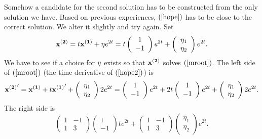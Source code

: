 \documentclass[leqno,DIV=calc,paper=a4,fontsize=11pt]{article}
\theoremstyle{definition}
\theoremstyle{plain}
\theoremstyle{remark}
\newcommand{\R}[1]{$(\ref{#1})$}
\begin{document}
Somehow a candidate for the second solution has to be constructed from
the only solution we have. Based on previous experiences, \R{hope} has
to be close to the correct solution. We alter it slightly and try
again. Set
\begin{equation}
{\bf x^{(2)}} = t{\bf x^{(1)}}+{\bf\eta}e^{2t}
=t\left(\begin{array}{c}1\\-1\end{array}\right)e^{2t}+
\left(\begin{array}{c}\eta_1\\\eta_2\end{array}\right)e^{2t}.
\label{hope2}
\end{equation}
We have to see if a choice for ${\bf\eta}$ exists so that
${\bf x^{(2)}}$ solves \R{mroot}. The left side of \R{mroot} (the time
derivative of \R{hope2}) is
\begin{equation}
{\bf x^{(2)}}' = {\bf x^{(1)}}+t{\bf
  x^{(1)}}'+\left(\begin{array}{c}\eta_1\\\eta_2\end{array}\right)2e^{2t}
=\left(\begin{array}{c}1\\-1\end{array}\right)e^{2t}+
2t\left(\begin{array}{c}1\\-1\end{array}\right)e^{2t}
+\left(\begin{array}{c}\eta_1\\\eta_2\end{array}\right)2e^{2t}.
\label{ls}
\end{equation}
The right side is
\begin{equation}
\left(\begin{array}{rr}1&-1\\1&3\end{array}\right)
\left(\begin{array}{c}1\\-1\end{array}\right)te^{2t}+
\left(\begin{array}{rr}1&-1\\1&3\end{array}\right)
\left(\begin{array}{c}\eta_1\\\eta_2\end{array}\right)e^{2t}.
\label{rs}
\end{equation}
\end{document}
